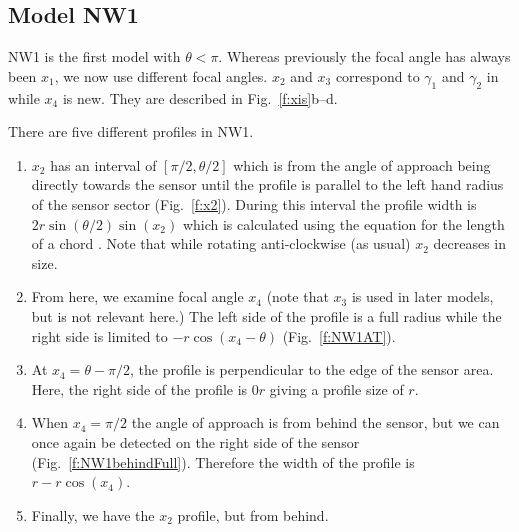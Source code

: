 \subsection{Model NW1} \label{NW1}

NW1 is the first model with $\theta < \pi$. Whereas previously the focal angle has always been $x_1$, we now use different focal angles. $x_2$ and $x_3$ correspond to $\gamma_1$ and $\gamma_2$ in \cite{rowcliffe2008estimating} while $x_4$ is new. They are described in Fig.~\ref{f:xis}b--d. 

There are five different profiles in NW1.
\begin{enumerate}
\item $x_2$ has an interval of $[\pi/2, \theta/2]$ which is from the angle of approach being directly towards the sensor until the profile is parallel to the left hand radius of the sensor sector (Fig.~\ref{f:x2}). During this interval the profile width is $2r\sin\left(\theta/2\right)\sin(x_2)$ which is calculated using the equation for the length of a chord . Note that while rotating anti-clockwise (as usual) $x_2$ decreases in size.
\item From here, we examine focal angle $x_4$ (note that $x_3$ is used in later models, but is not relevant here.)  The left side of the profile is a full radius while the right side is limited to $- r\cos(x_4 - \theta)$ (Fig.~\ref{f:NW1AT}).
\item At $x_4 =  \theta - \pi/2$, the profile is perpendicular to the edge of the sensor area. Here, the right side of the profile is $0r$ giving a profile size of $r$.   %
\item When $x_4 = \pi/2$ the angle of approach is from behind the sensor, but we can once again be detected on the right side of the sensor (Fig.~\ref{f:NW1behindFull}). Therefore the width of the profile is $r - r\cos(x_4)$.
\item  Finally, we have the $x_2$ profile, but from behind. 
\end{enumerate}





